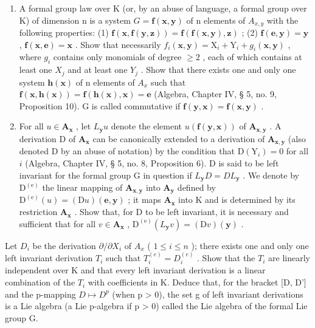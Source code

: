 \begin{enumerate}
\def\labelenumi{(\alph{enumi})}
\item
  A formal group law over K (or, by an abuse of language, a formal group over K) of dimension n is a system \(G = \mathbf{f}(\mathbf{x}, \mathbf{y})\) of n elements of \(A_{x,y}\) with the following properties: (1) \(\mathbf{f}(\mathbf{x}, \mathbf{f}(\mathbf{y}, \mathbf{z})) = \mathbf{f}(\mathbf{f}(\mathbf{x}, \mathbf{y}), \mathbf{z})\) ; (2) \(\mathbf{f}(\mathbf{e}, \mathbf{y}) = \mathbf{y}\) , \(\mathbf{f}(\mathbf{x}, \mathbf{e}) = \mathbf{x}\) . Show that necessarily \(f_{i}(\mathbf{x}, \mathbf{y}) = \mathrm{X}_{i} + \mathrm{Y}_{i} + g_{i}(\mathbf{x}, \mathbf{y})\) , where \(g_{i}\) contains only monomials of degree \(\geqslant 2\) , each of which contains at least one \(X_{j}\) and at least one \(Y_{j}\) . Show that there exists one and only one system \(\mathbf{h}(\mathbf{x})\) of n elements of \(A_{x}\) such that \(\mathbf{f}(\mathbf{x}, \mathbf{h}(\mathbf{x})) = \mathbf{f}(\mathbf{h}(\mathbf{x}), \mathbf{x}) = \mathbf{e}\) (Algebra, Chapter IV, § 5, no. 9, Proposition 10). G is called commutative if \(\mathbf{f}(\mathbf{y}, \mathbf{x}) = \mathbf{f}(\mathbf{x}, \mathbf{y})\) .
\item
  For all \(u \in \mathbf{A}_{\mathbf{x}}\) , let \(L_{\mathbf{y}}u\) denote the element \(u(\mathbf{f}(\mathbf{y},\mathbf{x}))\) of \(\mathbf{A}_{\mathbf{x},\mathbf{y}}\) . A derivation D of \(\mathbf{A}_{\mathbf{x}}\) can be canonically extended to a derivation of \(\mathbf{A}_{\mathbf{x},\mathbf{y}}\) (also denoted D by an abuse of notation) by the condition that \(\mathrm{D}(\mathrm{Y}_i) = 0\) for all \(i\) (Algebra, Chapter IV, § 5, no. 8, Proposition 6). D is said to be left invariant for the formal group G in question if \(L_{\mathbf{y}}D = DL_{\mathbf{y}}\) . We denote by \(\mathrm{D}^{(\mathrm{e})}\) the linear mapping of \(\mathbf{A}_{\mathbf{x},\mathbf{y}}\) into \(\mathbf{A}_{\mathbf{y}}\) defined by \(\mathrm{D}^{(\mathrm{e})}(u) = (\mathrm{D}u)(\mathbf{e},\mathbf{y})\) ; it maps \(\mathbf{A}_{\mathbf{x}}\) into K and is determined by its restriction \(\mathbf{A}_{\mathbf{x}}\) . Show that, for D to be left invariant, it is necessary and sufficient that for all \(v \in \mathbf{A}_{\mathbf{x}}\) , \(\mathrm{D}^{(\mathrm{e})}(L_{\mathbf{y}}v) = (\mathrm{D}v)(\mathbf{y})\) .
\end{enumerate}

Let \(D_{i}\) be the derivation \(\partial/\partial X_{i}\) of \(A_{x}\) ( \(1 \leqslant i \leqslant n\) ); there exists one and only one left invariant derivation \(T_{i}\) such that \(T_{i}^{(e)} = D_{i}^{(e)}\) . Show that the \(T_{i}\) are linearly independent over K and that every left invariant derivation is a linear combination of the \(T_{i}\) with coefficients in K. Deduce that, for the bracket {[}D, D'{]} and the p-mapping \(D \mapsto D^{p}\) (when p \textgreater{} 0), the set g of left invariant derivations is a Lie algebra (a Lie p-algebra if p \textgreater{} 0) called the Lie algebra of the formal Lie group G.

